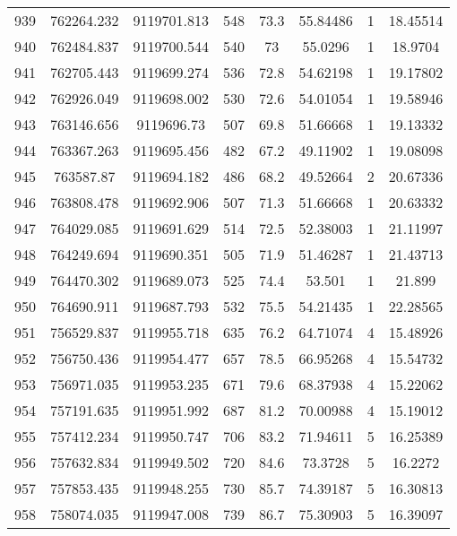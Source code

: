 \begin{longtable}{cccccccc}
939  & 762264.232      & 9119701.813      & 548     & 73.3  & 55.84486 & 1  & 18.45514 \\
940  & 762484.837      & 9119700.544      & 540     & 73    & 55.0296  & 1  & 18.9704  \\
941  & 762705.443      & 9119699.274      & 536     & 72.8  & 54.62198 & 1  & 19.17802 \\
942  & 762926.049      & 9119698.002      & 530     & 72.6  & 54.01054 & 1  & 19.58946 \\
943  & 763146.656      & 9119696.73       & 507     & 69.8  & 51.66668 & 1  & 19.13332 \\
944  & 763367.263      & 9119695.456      & 482     & 67.2  & 49.11902 & 1  & 19.08098 \\
945  & 763587.87       & 9119694.182      & 486     & 68.2  & 49.52664 & 2  & 20.67336 \\
946  & 763808.478      & 9119692.906      & 507     & 71.3  & 51.66668 & 1  & 20.63332 \\
947  & 764029.085      & 9119691.629      & 514     & 72.5  & 52.38003 & 1  & 21.11997 \\
948  & 764249.694      & 9119690.351      & 505     & 71.9  & 51.46287 & 1  & 21.43713 \\
949  & 764470.302      & 9119689.073      & 525     & 74.4  & 53.501   & 1  & 21.899   \\
950  & 764690.911      & 9119687.793      & 532     & 75.5  & 54.21435 & 1  & 22.28565 \\
951  & 756529.837      & 9119955.718      & 635     & 76.2  & 64.71074 & 4  & 15.48926 \\
952  & 756750.436      & 9119954.477      & 657     & 78.5  & 66.95268 & 4  & 15.54732 \\
953  & 756971.035      & 9119953.235      & 671     & 79.6  & 68.37938 & 4  & 15.22062 \\
954  & 757191.635      & 9119951.992      & 687     & 81.2  & 70.00988 & 4  & 15.19012 \\
955  & 757412.234      & 9119950.747      & 706     & 83.2  & 71.94611 & 5  & 16.25389 \\
956  & 757632.834      & 9119949.502      & 720     & 84.6  & 73.3728  & 5  & 16.2272  \\
957  & 757853.435      & 9119948.255      & 730     & 85.7  & 74.39187 & 5  & 16.30813 \\
958  & 758074.035      & 9119947.008      & 739     & 86.7  & 75.30903 & 5  & 16.39097 \\

\end{longtable}
